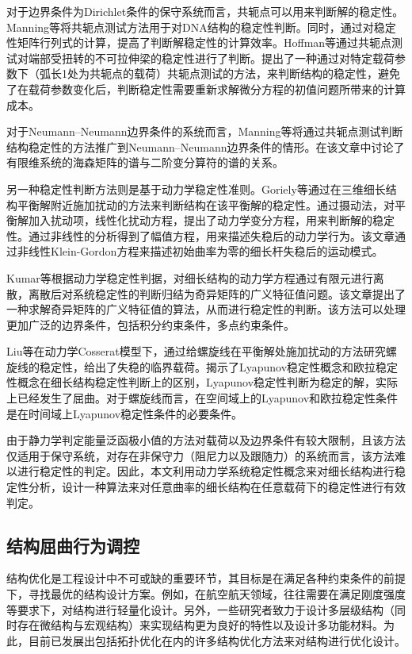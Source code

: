 对于边界条件为Dirichlet条件的保守系统而言，共轭点可以用来判断解的稳定性。Manning等\cite{manning1998isoperimetric}将共轭点测试方法用于对DNA结构的稳定性判断。同时，通过对稳定性矩阵行列式的计算，提高了判断解稳定性的计算效率。Hoffman等\cite{hoffman2002calculation}通过共轭点测试对端部受扭转的不可拉伸梁的稳定性进行了判断。提出了一种通过对特定载荷参数下（弧长1处为共轭点的载荷）共轭点测试的方法，来判断结构的稳定性，避免了在载荷参数变化后，判断稳定性需要重新求解微分方程的初值问题所带来的计算成本。

对于Neumann–Neumann边界条件的系统而言，Manning等\cite{manning2009conjugate}将通过共轭点测试判断结构稳定性的方法推广到Neumann–Neumann边界条件的情形。在该文章中讨论了有限维系统的海森矩阵的谱与二阶变分算符的谱的关系。

另一种稳定性判断方法则是基于动力学稳定性准则。Goriely等\cite{goriely2000nonlinear}通过在三维细长结构平衡解附近施加扰动的方法来判断结构在该平衡解的稳定性。通过摄动法，对平衡解加入扰动项，线性化扰动方程，提出了动力学变分方程，用来判断解的稳定性。通过非线性的分析得到了幅值方程，用来描述失稳后的动力学行为。该文章通过非线性Klein-Gordon方程来描述初始曲率为零的细长杆失稳后的运动模式。

Kumar等\cite{kumar2010generalized}根据动力学稳定性判据，对细长结构的动力学方程通过有限元进行离散，离散后对系统稳定性的判断归结为奇异矩阵的广义特征值问题。该文章提出了一种求解奇异矩阵的广义特征值的算法，从而进行稳定性的判断。该方法可以处理更加广泛的边界条件，包括积分约束条件，多点约束条件。

Liu等\cite{liu2011stability}在动力学Cosserat模型下，通过给螺旋线在平衡解处施加扰动的方法研究螺旋线的稳定性，给出了失稳的临界载荷。揭示了Lyapunov稳定性概念和欧拉稳定性概念在细长结构稳定性判断上的区别，Lyapunov稳定性判断为稳定的解，实际上已经发生了屈曲。对于螺旋线而言，在空间域上的Lyapunov和欧拉稳定性条件是在时间域上Lyapunov稳定性条件的必要条件。

由于静力学判定能量泛函极小值的方法对载荷以及边界条件有较大限制，且该方法仅适用于保守系统，对存在非保守力（阻尼力以及跟随力）的系统而言，该方法难以进行稳定性的判定。因此，本文利用动力学系统稳定性概念来对细长结构进行稳定性分析，设计一种算法来对任意曲率的细长结构在任意载荷下的稳定性进行有效判定。
\subsection{结构屈曲行为调控}
结构优化是工程设计中不可或缺的重要环节，其目标是在满足各种约束条件的前提下，寻找最优的结构设计方案。例如，在航空航天领域，往往需要在满足刚度强度等要求下，对结构进行轻量化设计。另外，一些研究者致力于设计多层级结构（同时存在微结构与宏观结构）来实现结构更为良好的特性以及设计多功能材料。为此，目前已发展出包括拓扑优化\cite{jihong2021review}在内的许多结构优化方法来对结构进行优化设计。

